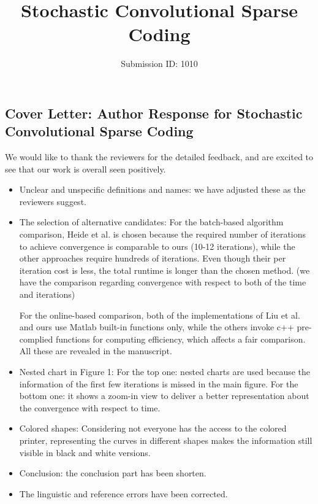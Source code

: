 \documentclass{egpubl}
\title{Stochastic Convolutional Sparse Coding}
\author{Submission ID: 1010}
\begin{document}
\begin{titlepage} 
\part*{Cover Letter: Author Response for Stochastic Convolutional Sparse Coding}

We would like to thank the reviewers for the detailed feedback, and are excited to see that our work is overall seen positively.

\begin{itemize}
\item Unclear and unspecific definitions and names: we have adjusted these as the reviewers suggest.

\item The selection of alternative candidates: For the batch-based algorithm comparison, Heide et al. is chosen because the required number of iterations to achieve convergence is comparable to ours (10-12 iterations), while the other approaches require hundreds of iterations. Even though their per iteration cost is less, the total runtime is longer than the chosen method. (we have the comparison regarding convergence with respect to both of the time and iterations)

For the online-based comparison, both of the implementations of Liu et al. and ours use Matlab built-in functions only, while the others invoke c++ pre-complied functions for computing efficiency, which affects a fair comparison. All these are revealed in the manuscript.

\item Nested chart in Figure 1: For the top one: nested charts are used because the information of the first few iterations is missed in the main figure.  For the bottom one: it shows a zoom-in view to deliver a better representation about the convergence with respect to time.

\item Colored shapes: Considering not everyone has the access to the colored printer, representing the curves in different shapes makes the information still visible in black and white versions.

\item Conclusion: the conclusion part has been shorten.

\item The linguistic and reference errors have been corrected.
\end{itemize}

\end{titlepage}
\end{document}
